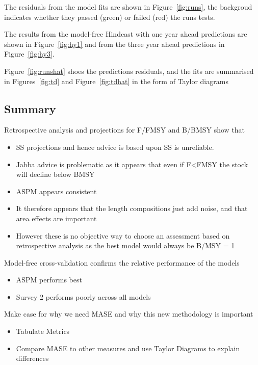 \documentclass[a4paper]{article}
\begin{document}
The residuals from the model fits are shown in Figure~\ref{fig:runs}, the backgroud indicates whether they passed (green) or failed (red) the runs tests. 

The results from the model-free  Hindcast with one year ahead predictions are shown in Figure~\ref{fig:hy1} and from the three year ahead predictions in Figure~\ref{fig:hy3}.

Figure~\ref{fig:runshat} shoes the predictions residuals, and the fits are summarised in Figures~\ref{fig:td} and Figure~\ref{fig:tdhat} in the form of Taylor diagrams

\subsection*{Summary}

\begin{description}
    \item{Retrospective analysis and projections for F/FMSY and B/BMSY} show that
    \begin{itemize}
        \item SS projections and hence advice is based upon SS is unreliable.
        \item Jabba advice is problematic as it appears that even if F<FMSY the stock will decline below BMSY
        \item ASPM appears consistent
        \item It therefore appears that the length compositions just add noise, and that area effects are important
        \item However these is no objective way to choose an assessment based on retrospective analysis as the best model would always be B/MSY = 1 
        \end{itemize}
    \item{Model-free cross-validation} confirms the relative performance of the models
    \begin{itemize}
        \item ASPM performs best
        \item Survey 2 performs poorly across all models
   \end{itemize}
   \item{Make case for why we need MASE and why this new methodology is important}
    \begin{itemize}
        \item Tabulate Metrics
        \item Compare MASE to other measures and use Taylor Diagrams to explain differences
   \end{itemize}

\end{description}
\end{document}
